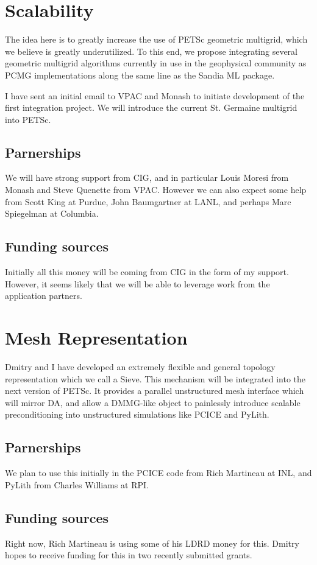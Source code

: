 \section{Scalability}

	The idea here is to greatly increase the use of PETSc geometric multigrid, which we believe is greatly
underutilized. To this end, we propose integrating several geometric multigrid algorithms currently in use in the
geophysical community as PCMG implementations along the same line as the Sandia ML package.

	I have sent an initial email to VPAC and Monash to initiate development of the first integration project. We
will introduce the current St. Germaine multigrid into PETSc.

  \subsection{Parnerships}

	We will have strong support from CIG, and in particular Louis Moresi from Monash and Steve Quenette from VPAC.
However we can also expect some help from Scott King at Purdue, John Baumgartner at LANL, and perhaps Marc Spiegelman at
Columbia.

  \subsection{Funding sources}

	Initially all this money will be coming from CIG in the form of my support. However, it seems likely that we
will be able to leverage work from the application partners.

\section{Mesh Representation}

	Dmitry and I have developed an extremely flexible and general topology representation which we call a Sieve.
This mechanism will be integrated into the next version of PETSc. It provides a parallel unstructured mesh interface
which will mirror DA, and allow a DMMG-like object to painlessly introduce scalable preconditioning into unstructured
simulations like PCICE and PyLith.

  \subsection{Parnerships}

	We plan to use this initially in the PCICE code from Rich Martineau at INL, and PyLith from Charles Williams at
RPI.

  \subsection{Funding sources}

	Right now, Rich Martineau is using some of his LDRD money for this. Dmitry hopes to receive funding for this in
two recently submitted grants.
